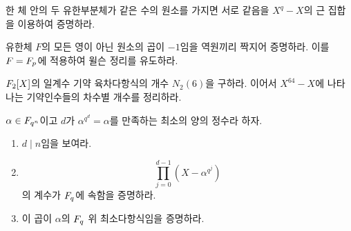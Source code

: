 \begin{exercise}
한 체 안의 두 유한부분체가 같은 수의 원소를 가지면 서로 같음을 $X^q-X$의 근 집합을 이용하여 증명하라.
\end{exercise}

\begin{exercise}[*]
유한체 $F$의 모든 영이 아닌 원소의 곱이 $-1$임을 역원끼리 짝지어 증명하라. 이를 $F=F_p$에 적용하여 윌슨 정리를 유도하라.
\end{exercise}

\begin{exercise}
$F_2[X]$의 일계수 기약 육차다항식의 개수 $N_2(6)$을 구하라. 이어서 $X^{64}-X$에 나타나는 기약인수들의 차수별 개수를 정리하라.
\end{exercise}

\begin{exercise}[*]
$\alpha\in F_{q^n}$이고 $d$가 $\alpha^{q^d}=\alpha$를 만족하는 최소의 양의 정수라 하자.
\begin{enumerate}[label=(\alph*)]
  \item $d\mid n$임을 보여라.
  \item
  \[
    \prod_{j=0}^{d-1}(X-\alpha^{q^j})
  \]
  의 계수가 $F_q$에 속함을 증명하라.
  \item 이 곱이 $\alpha$의 $F_q$ 위 최소다항식임을 증명하라.
\end{enumerate}
\end{exercise}
